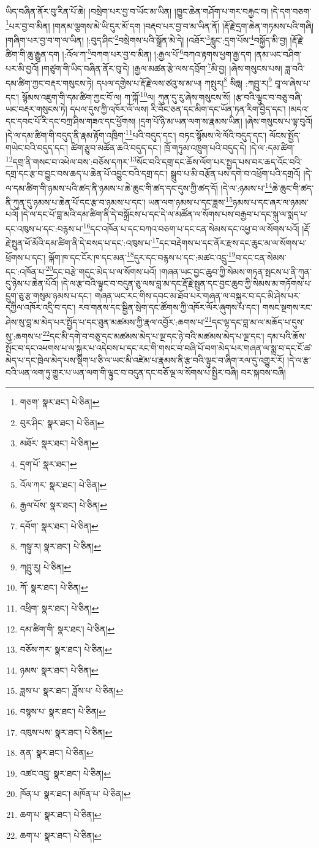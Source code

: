 ཡིད་བཞིན་ནོར་བུ་རིན་པོ་ཆེ། །བསྲེག་པར་བྱ་བ་ཡོང་མ་ཡིན། །ཁྱུང་ཆེན་གཤོག་པ་གར་བརྐྱང་བ། །དེ་དག་བཅག་\footnote{གཅག་  སྣར་ཐང་།  པེ་ཅིན། }པར་བྱ་བ་མིན། །གནམ་ལྕགས་མེ་ཡི་དུར་མོ་དག །བརྡབ་པར་བྱ་བ་མ་ཡིན་ནོ། །རྡོ་རྗེ་དྲག་ཆེན་གཏམས་པའི་གཞི། །གཞིག་པར་བྱ་བ་ག་ལ་ཡིན། །:བུད་ཤིང་\footnote{བུར་ཤིང་  སྣར་ཐང་།  པེ་ཅིན། }བསྲེགས་པའི་སྒྲོན་མེ་དེ། །འཐོར་\footnote{མཐོར་  སྣར་ཐང་།  པེ་ཅིན། }རླུང་:དྲག་པོས་\footnote{དྲག་པོ་  སྣར་ཐང་། }བསྐྱོད་མི་བྱ། །རྡོ་རྗེ་ཚིག་གི་ཆུ་རྒྱུན་དག །:འོལ་ཀ་\footnote{འོལ་ཀར་  སྣར་ཐང་།  པེ་ཅིན། }བཀག་པར་བྱ་བ་མིན། །:རྒྱལ་པོ་\footnote{རྒྱལ་པོས་  སྣར་ཐང་།  པེ་ཅིན། }བཀའ་རྟགས་ཕྱག་རྒྱ་དག །ནམ་ཡང་བཤིག་པར་མི་བྱའོ། །གཙུག་གི་ཡིད་བཞིན་ནོར་བུ་དེ། །རྒྱལ་མཚན་རྩེ་ལས་དབྲོག་\footnote{དབོག་  སྣར་ཐང་།  པེ་ཅིན། }མི་བྱ། །ཞེས་གསུངས་པས། ཟླ་བའི་དམ་ཚིག་ཀྱང་བརྡར་གསུངས་ཏེ། དཔལ་དགྱེས་པ་རྡོ་རྗེ་ལས་ཙའུ་ས་མ་ཡ། ཀསྤུར།\footnote{ཀསྟུ་ར།  སྣར་ཐང་།  པེ་ཅིན། } སིཧླ། :ཀབྤུ་ར།\footnote{ཀབྤུ་རུ།  པེ་ཅིན། } བཱ་ལ་ཞེས་པ་དང་། སྙོམས་འཇུག་གི་དམ་ཚིག་ཀྱང་བོ་ལ། ཀ་ཀྐོ་\footnote{ཀོ་  སྣར་ཐང་།  པེ་ཅིན། }ལ། ཀུན་དུ་རུ་ཞེས་གསུངས་སོ། །རྩ་བའི་ལྟུང་བ་བཅུ་བཞི་ཡང་བརྡར་གསུངས་ཏེ། དཔལ་དུས་ཀྱི་འཁོར་ལོ་ལས། རི་བོང་ཅན་དང་མིག་དང་ཡོན་ཏན་རིག་བྱེད་དང་། །མདའ་དང་དབང་པོ་རི་དང་བཀྲ་ཤིས་གཟའ་དང་ཕྱོགས། །དྲག་པོ་ཉི་མ་ཡན་ལག་ས་རྣམས་ཡིན། །ཞེས་གསུངས་པ་ལྟ་བུའོ། །དེ་ལ་དམ་ཚིག་གི་བདུད་ནི་རྣམ་རྟོག་འཁྲིག་\footnote{འཕྲིག་  སྣར་ཐང་།  པེ་ཅིན། }པའི་བདུད་དང་། བཏང་སྙོམས་ལེ་ལོའི་བདུད་དང་། ལོངས་སྤྱོད་གཡེང་བའི་བདུད་དང་། ཚིག་རྩུབ་མཚོན་ཆའི་བདུད་དང་། ཁྲོ་གཏུམ་འཁྲུག་པའི་བདུད་དེ། །དེ་ལ་:དམ་ཚིག་\footnote{དམ་ཚིག་གི་  སྣར་ཐང་།  པེ་ཅིན། }དགྲ་ནི་གསང་བ་འཕེལ་བས་:བཅོས་དཀར་\footnote{བཅོས་ཀར་  སྣར་ཐང་།  པེ་ཅིན། }སོང་བའི་དགྲ་དང་ཆོས་ལོག་པར་སྤྱད་པས་བར་ཆད་འོང་བའི་དགྲ་དང་རྩ་བ་བྱུང་བས་ཆད་པ་ཆེན་པོ་འབྱུང་བའི་དགྲ་དང་། སྒྲུབ་པ་མི་བརྩོན་པས་དགེ་བ་འཕྲོག་པའི་དགྲའོ། །དེ་ལ་དམ་ཚིག་གི་ཉམས་པའི་ཚད་ནི་ཉམས་པ་ཆེ་ཆུང་གི་ཚད་དང་དུས་ཀྱི་ཚད་དོ། །དེ་ལ་:ཉམས་པ་\footnote{ཉམས་  སྣར་ཐང་།  པེ་ཅིན། }ཆེ་ཆུང་གི་ཚད་ནི་ཀུན་དུ་ཉམས་པ་ཆེན་པོ་དང་རྩ་བ་ཉམས་པ་དང་། ཡན་ལག་ཉམས་པ་དང་ཟླས་\footnote{ཟླས་པ་  སྣར་ཐང་། ཟློས་པ་  པེ་ཅིན། }ཉམས་པ་དང་ཞར་ལ་ཉམས་པའོ། །དེ་ལ་དང་པོ་བླ་མའི་དམ་ཚིག་ནི་དེ་བསྐྲོངས་པ་དང་དེ་ལ་མཚོན་ལ་སོགས་པས་བརྒྱབ་པ་དང་སྐུ་ལ་སྨད་པ་དང་འཁུས་པ་དང་:བརྙས་པ་\footnote{བསྙས་པ་  སྣར་ཐང་།  པེ་ཅིན། }དང་འཁོན་པ་དང་བཀའ་བཅག་པ་དང་ངན་སེམས་དང་འཕྱ་བ་ལ་སོགས་པའོ། །རྡོ་རྗེ་སྤུན་ཕོ་མོའི་དམ་ཚིག་ནི་དེ་བསད་པ་དང་:འཁུས་པ་\footnote{འཁུས་པས་  སྣར་ཐང་།  པེ་ཅིན། }དང་བརྡེགས་པ་དང་ནོར་རྫས་དང་ཆུང་མ་ལ་སོགས་པ་ཕྲོགས་པ་དང་། ལྐོག་ཁ་དང་ངོར་ཁ་དང་མན་\footnote{ནན་  སྣར་ཐང་།  པེ་ཅིན། }དུར་དང་བརྙས་པ་དང་:མཚང་འདྲུ་\footnote{འཚང་འབྲུ་  སྣར་ཐང་།  པེ་ཅིན། }བ་དང་ངན་སེམས་དང་:འཁོན་པ་\footnote{ཁོན་པ་  སྣར་ཐང་། མཁོན་པ་  པེ་ཅིན། }དང་བརྩེ་གདུང་མེད་པ་ལ་སོགས་པའོ། །གཞན་ཡང་བྱང་ཆུབ་ཀྱི་སེམས་གཏན་སྤངས་པ་ནི་ཀུན་དུ་ཉེས་པ་ཆེན་པོའོ། །དེ་ལ་རྩ་བའི་ལྟུང་བ་བདུན་ཅུ་ལས་བླ་མ་དང་རྡོ་རྗེ་སྤུན་དང་བྱང་ཆུབ་ཀྱི་སེམས་མ་གཏོགས་པ་དྲུག་ཅུ་རྩ་གསུམ་ཉམས་པ་དང་། གཞན་ཡང་རང་གིས་དབང་མ་ཐོབ་པར་གཞན་ལ་བསྐུར་བ་དང་མི་ཤེས་པར་དཀྱིལ་འཁོར་འདྲི་བ་དང་། རབ་གནས་དང་སྦྱིན་སྲེག་དང་ཚོགས་ཀྱི་འཁོར་ལོར་ཞུགས་པ་དང་། གསང་སྔགས་རང་ཤེས་སུ་བླ་མ་མེད་པར་སྤྱོད་པ་དང་ཐུན་མཚམས་ཀྱི་རྣལ་འབྱོར་:ཆགས་པ་\footnote{ཆག་པ་  སྣར་ཐང་།  པེ་ཅིན། }དང་ལྷ་དང་བླ་མ་ལ་མཆོད་པ་དུས་སུ་:ཆགས་པ་\footnote{ཆག་པ་  སྣར་ཐང་།  པེ་ཅིན། }དང་མི་དགེ་བ་བཅུ་དང་མཚམས་མེད་པ་ལྔ་དང་ཉེ་བའི་མཚམས་མེད་པ་ལྔ་དང་། དམ་པའི་ཆོས་སྤོང་བ་དང་འཕགས་པ་ལ་སྐུར་པ་འདེབས་པ་དང་རང་གི་གསང་བ་བཞི་པོ་བག་མེད་པར་གཞན་ལ་སྨྲ་བ་དང་ངོ་ཚ་མེད་པ་དང་ཁྲེལ་མེད་པས་སྡིག་པ་ཅི་ལ་ཡང་མི་འཛེམ་པ་རྣམས་ནི་རྩ་བའི་ལྟུང་བ་ཞིག་རལ་དུ་འགྱུར་རོ། །དེ་ལ་རྩ་བའི་ཡན་ལག་ཏུ་གྱུར་པ་ཡན་ལག་གི་ལྟུང་བ་བདུན་དང་བཅོ་ལྔ་ལ་སོགས་པ་སྤྱིར་བཞི། བར་སྐབས་བཞི། 